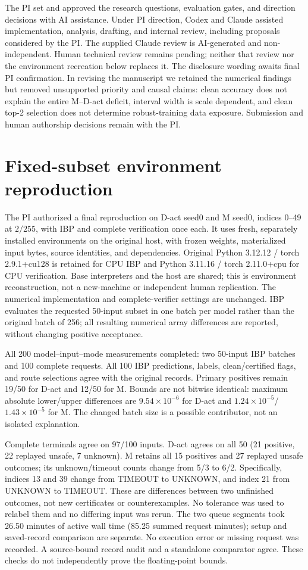 The PI set and approved the research questions, evaluation gates, and direction
decisions with AI assistance. Under PI direction, Codex and Claude assisted
implementation, analysis, drafting, and internal review, including proposals
considered by the PI. The supplied Claude review is AI-generated and
non-independent. Human technical review remains pending; neither that review
nor the environment recreation below replaces it. The disclosure wording
awaits final PI confirmation. In revising the manuscript we retained the numerical findings but
removed unsupported priority and causal claims: clean accuracy does not
explain the entire M--D-act deficit, interval width is scale dependent, and
clean top-2 selection does not determine robust-training data exposure.
Submission and human authorship decisions remain with the PI.

\section{Fixed-subset environment reproduction}
\label{app:reproduction}
The PI authorized a final reproduction on D-act seed0 and M seed0, indices
0--49 at $2/255$, with IBP and complete verification once each. It uses fresh,
separately installed environments on the original host, with frozen weights,
materialized input bytes, source identities, and dependencies. Original Python
3.12.12 / torch 2.9.1+cu128 is retained for CPU IBP and Python 3.11.16 /
torch 2.11.0+cpu for CPU verification. Base interpreters and the host are
shared; this is environment reconstruction, not a new-machine or independent
human replication. The numerical implementation and complete-verifier settings
are unchanged. IBP evaluates the requested 50-input subset in one batch per
model rather than the original batch of 256; all resulting numerical
array differences are reported, without changing positive acceptance.

All 200 model--input--mode measurements completed: two 50-input IBP batches
and 100 complete requests. All 100 IBP predictions, labels, clean/certified
flags, and route selections agree with the original records. Primary positives
remain 19/50 for D-act and 12/50 for M. Bounds are not bitwise identical:
maximum absolute lower/upper differences are $9.54\times10^{-6}$ for D-act
and $1.24\times10^{-5}$/$1.43\times10^{-5}$ for M. The changed batch size
is a possible contributor, not an isolated explanation.

Complete terminals agree on 97/100 inputs. D-act agrees on all 50
(21 positive, 22 replayed unsafe, 7 unknown). M retains all 15 positives and
27 replayed unsafe outcomes; its unknown/timeout counts change from 5/3 to
6/2. Specifically, indices 13 and 39 change from TIMEOUT to UNKNOWN, and
index 21 from UNKNOWN to TIMEOUT. These are differences between two unfinished
outcomes, not new certificates or counterexamples. No tolerance was used to
relabel them and no differing input was rerun. The two queue segments took
26.50 minutes of active wall time (85.25 summed request minutes); setup and
saved-record comparison are separate. No execution error or missing request
was recorded. A source-bound record audit and a standalone comparator agree.
These checks do not independently prove the floating-point bounds.

